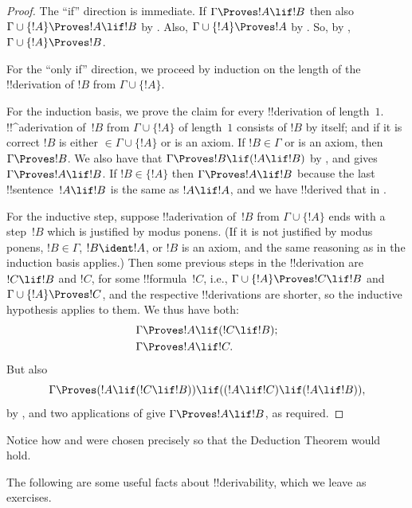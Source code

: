 \begin{proof}
The ``if'' direction is immediate.  If $\Gamma \Proves !A \lif !B$
then also $\Gamma \cup \{!A\} \Proves !A \lif !B$ by
.  Also, $\Gamma \cup \{!A\} \Proves !A$ by
. So, by , $\Gamma \cup
\{!A\} \Proves !B$.

For the ``only if'' direction, we proceed by induction on the length
of the !!{derivation} of $!B$ from $\Gamma \cup \{!A\}$.

For the induction basis, we prove the claim for every !!{derivation}
of length~$1$. !!^a{derivation} of~$!B$ from $\Gamma \cup \{!A\}$ of
length~$1$ consists of $!B$ by itself; and if it is correct $!B$ is
either $\in \Gamma \cup \{!A\}$ or is an axiom.  If $!B \in \Gamma$ or
is an axiom, then $\Gamma \Proves !B$. We also have that $\Gamma
\Proves !B \lif (!A \lif !B)$ by , and
 gives $\Gamma \Proves !A \lif !B$. If $!B \in \{ !A\}$
then $\Gamma \Proves !A \lif !B$ because the last !!{sentence}~$!A
\lif !B$ is the same as $!A \lif !A$, and we have !!{derive}d that in
.

For the inductive step, suppose !!a{derivation} of~$!B$ from
$\Gamma \cup \{!A\}$ ends with a step~$!B$ which is justified by modus
ponens. (If it is not justified by modus ponens, $!B \in \Gamma$, $!B
\ident !A$, or $!B$ is an axiom, and the same reasoning as in the
induction basis applies.) Then some previous steps in the
!!{derivation} are $!C \lif !B$ and $!C$, for some !!{formula}~$!C$,
i.e., $\Gamma \cup \{!A\} \Proves !C \lif !B$ and $\Gamma \cup \{!A\}
\Proves !C$, and the respective !!{derivation}s are shorter, so the
inductive hypothesis applies to them. We thus have both:
\begin{align*}
  & \Gamma \Proves !A \lif (!C \lif !B); \\
  & \Gamma \Proves !A \lif !C.
\end{align*}
But also
\[
\Gamma \Proves (!A \lif (!C \lif !B)) \lif
((!A\lif !C)  \lif (!A \lif !B)),
\]
by , and two applications of  give
$\Gamma \Proves !A \lif !B$, as required.
\end{proof}

Notice how  and  were chosen
precisely so that the Deduction Theorem would hold.

The following are some useful facts about !!{derivability}, which we
leave as exercises.

